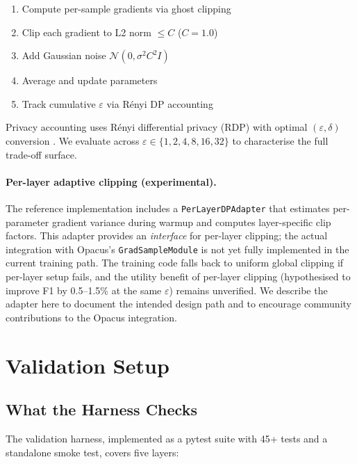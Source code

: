 \documentclass{article}
\begin{document}
\begin{enumerate}
  \item Compute per-sample gradients via ghost clipping
  \item Clip each gradient to L2 norm $\leq C$ ($C=1.0$)
  \item Add Gaussian noise $\mathcal{N}(0, \sigma^2 C^2 I)$
  \item Average and update parameters
  \item Track cumulative $\varepsilon$ via R\'enyi DP accounting
\end{enumerate}

Privacy accounting uses R\'enyi differential privacy (RDP) with
optimal $(\varepsilon,\delta)$ conversion \cite{abadi2016deep}.
We evaluate across $\varepsilon \in \{1, 2, 4, 8, 16, 32\}$ to
characterise the full trade-off surface.

\paragraph{Per-layer adaptive clipping (experimental).}
The reference implementation includes a \texttt{PerLayerDPAdapter}
that estimates per-parameter gradient variance during warmup and
computes layer-specific clip factors. This adapter provides an
\emph{interface} for per-layer clipping; the actual integration
with Opacus's \texttt{GradSampleModule} is not yet fully implemented
in the current training path. The training code falls back to uniform
global clipping if per-layer setup fails, and the utility benefit
of per-layer clipping (hypothesised to improve F1 by
0.5--1.5\% at the same $\varepsilon$) remains unverified.
We describe the adapter here to document the intended design path
and to encourage community contributions to the Opacus integration.


\section{Validation Setup}
\label{sec:validation}

\subsection{What the Harness Checks}

The validation harness, implemented as a pytest suite with 45+ tests and
a standalone smoke test, covers five layers:
\end{document}
